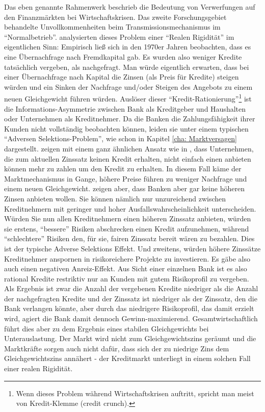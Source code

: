Das eben genannte Rahmenwerk beschrieb die Bedeutung von Verwerfungen auf den Finanzmärkten bei Wirtschaftskrisen. Das zweite Forschungsgebiet behandelte Unvollkommenheiten beim Transmissionsmechanismus im "`Normalbetrieb"'.  \textcite{Stiglitz1981} analysierten dieses Problem einer "`Realen Rigidität"' im eigentlichen Sinn: Empirisch ließ sich in den 1970er Jahren beobachten, dass es eine Übernachfrage nach Fremdkapital gab. Es wurden also weniger Kredite tatsächlich vergeben, als nachgefragt. Man würde eigentlich erwarten, dass bei einer Übernachfrage nach Kapital die Zinsen (als Preis für Kredite) steigen würden und ein Sinken der Nachfrage und/oder Steigen des Angebots zu einem neuen Gleichgewicht führen würden. Auslöser dieser "`Kredit-Rationierung"'\footnote{Wenn dieses Problem während Wirtschaftskrisen auftritt, spricht man meist von Kredit-Klemme (credit crunch).} ist die Informations-Asymmetrie zwischen Bank als Kreditgeber und Haushalten oder Unternehmen als Kreditnehmer. Da die Banken die Zahlungsfähigkeit ihrer Kunden nicht vollständig beobachten können, leiden sie unter einem typischen "`Adversen Selektions-Problem"', wie schon in Kapitel \ref{cha: Marktversagen} dargestellt. \textcite{Stiglitz1981} zeigen mit einem ganz ähnlichen Ansatz wie in \textcite{Stiglitz1976a}, dass Unternehmen, die zum aktuellen Zinssatz keinen Kredit erhalten, nicht einfach einen anbieten können mehr zu zahlen um den Kredit zu erhalten. In diesem Fall käme der Marktmechanismus in Gange, höhere Preise führen zu weniger Nachfrage und einem neuen Gleichgewicht. \textcite{Stiglitz1981} zeigen aber, dass Banken aber gar keine höheren Zinsen anbieten wollen. Sie können nämlich nur unzureichend zwischen Kreditnehmern mit geringer und hoher Ausfallswahrscheinlichkeit unterscheiden. Würden Sie nun allen Kreditnehmern einen höheren Zinssatz anbieten, würden sie erstens, "`bessere"' Risiken abschrecken einen Kredit aufzunehmen, während "`schlechtere"' Risiken den, für sie, fairen Zinssatz bereit wären zu bezahlen. Dies ist der typische Adverse Selektions Effekt. Und zweitens, würden höhere Zinssätze Kreditnehmer anspornen in risikoreichere Projekte zu investieren. Es gäbe also auch einen negativen Anreiz-Effekt. Aus Sicht einer einzelnen Bank ist es also rational Kredite restriktiv nur an Kunden mit gutem Risikoprofil zu vergeben. Als Ergebnis ist zwar die Anzahl der vergebenen Kredite niedriger als die Anzahl der nachgefragten Kredite und der Zinssatz ist niedriger als der Zinssatz, den die Bank verlangen könnte, aber durch das niedrigere Risikoprofil, das damit erzielt wird, agiert die Bank damit dennoch Gewinn-maximierend. Gesamtwirtschaftlich führt dies aber zu dem Ergebnis eines stabilen Gleichgewichts bei Unterauslastung. Der Markt wird nicht zum Gleichgewichtszins geräumt und die Marktkräfte sorgen auch nicht dafür, dass sich der zu niedrige Zins dem Gleichgewichtszins annähert - der Kreditmarkt unterliegt in einem solchen Fall einer realen Rigidität.


